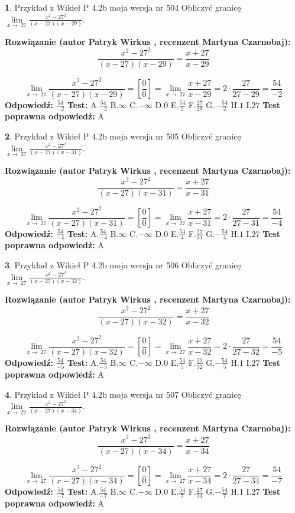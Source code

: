\documentclass[12pt, a4paper]{article}
\theoremstyle{definition} %
\newtheorem{zad}{}
\newcommand{\zadStart}[1]{\begin{zad}#1\newline}
\newcommand{\zadStop}{\end{zad}}
\newcommand{\rozwStart}[2]{\noindent \textbf{Rozwiązanie (autor #1 , recenzent #2): }\newline}
\newcommand{\rozwStop}{\newline}
\newcommand{\odpStart}{\noindent \textbf{Odpowiedź:}\newline}
\newcommand{\odpStop}{\newline}
\newcommand{\testStart}{\noindent \textbf{Test:}\newline}
\newcommand{\testStop}{\newline}
\newcommand{\kluczStart}{\noindent \textbf{Test poprawna odpowiedź:}\newline}
\newcommand{\kluczStop}{\newline}
\begin{document}
\zadStart{Przykład z Wikieł P 4.2b moja wersja nr 504}
Obliczyć granicę $\lim\limits_{x\to\ 27}\frac{x^{2}-27^{2}}{(x-27)(x-29)}$.
\zadStop
\rozwStart{Patryk Wirkus}{Martyna Czarnobaj}
$$\frac{x^{2}-27^{2}}{(x-27)(x-29)}=\frac{x+27}{x-29}$$

$$\lim\limits_{x\to\ 27}\frac{x^{2}-27^{2}}{(x-27)(x-29)}=[\frac{0}{0}]=\lim\limits_{x\to\ 27}\frac{x+27}{x-29}=2 \cdot \frac{27}{27-29} = \frac{54}{-2}$$
\rozwStop
\odpStart
$\frac{54}{-2}$
\odpStop
\testStart
A.$\frac{54}{-2}$
B.$\infty$
C.$-\infty$
D.$0$
E.$\frac{54}{2}$
F.$\frac{27}{29}$
G.$-\frac{54}{2}$
H.$1$
I.$27$
\testStop
\kluczStart
A
\kluczStop



\zadStart{Przykład z Wikieł P 4.2b moja wersja nr 505}
Obliczyć granicę $\lim\limits_{x\to\ 27}\frac{x^{2}-27^{2}}{(x-27)(x-31)}$.
\zadStop
\rozwStart{Patryk Wirkus}{Martyna Czarnobaj}
$$\frac{x^{2}-27^{2}}{(x-27)(x-31)}=\frac{x+27}{x-31}$$

$$\lim\limits_{x\to\ 27}\frac{x^{2}-27^{2}}{(x-27)(x-31)}=[\frac{0}{0}]=\lim\limits_{x\to\ 27}\frac{x+27}{x-31}=2 \cdot \frac{27}{27-31} = \frac{54}{-4}$$
\rozwStop
\odpStart
$\frac{54}{-4}$
\odpStop
\testStart
A.$\frac{54}{-4}$
B.$\infty$
C.$-\infty$
D.$0$
E.$\frac{54}{4}$
F.$\frac{27}{31}$
G.$-\frac{54}{4}$
H.$1$
I.$27$
\testStop
\kluczStart
A
\kluczStop



\zadStart{Przykład z Wikieł P 4.2b moja wersja nr 506}
Obliczyć granicę $\lim\limits_{x\to\ 27}\frac{x^{2}-27^{2}}{(x-27)(x-32)}$.
\zadStop
\rozwStart{Patryk Wirkus}{Martyna Czarnobaj}
$$\frac{x^{2}-27^{2}}{(x-27)(x-32)}=\frac{x+27}{x-32}$$

$$\lim\limits_{x\to\ 27}\frac{x^{2}-27^{2}}{(x-27)(x-32)}=[\frac{0}{0}]=\lim\limits_{x\to\ 27}\frac{x+27}{x-32}=2 \cdot \frac{27}{27-32} = \frac{54}{-5}$$
\rozwStop
\odpStart
$\frac{54}{-5}$
\odpStop
\testStart
A.$\frac{54}{-5}$
B.$\infty$
C.$-\infty$
D.$0$
E.$\frac{54}{5}$
F.$\frac{27}{32}$
G.$-\frac{54}{5}$
H.$1$
I.$27$
\testStop
\kluczStart
A
\kluczStop



\zadStart{Przykład z Wikieł P 4.2b moja wersja nr 507}
Obliczyć granicę $\lim\limits_{x\to\ 27}\frac{x^{2}-27^{2}}{(x-27)(x-34)}$.
\zadStop
\rozwStart{Patryk Wirkus}{Martyna Czarnobaj}
$$\frac{x^{2}-27^{2}}{(x-27)(x-34)}=\frac{x+27}{x-34}$$

$$\lim\limits_{x\to\ 27}\frac{x^{2}-27^{2}}{(x-27)(x-34)}=[\frac{0}{0}]=\lim\limits_{x\to\ 27}\frac{x+27}{x-34}=2 \cdot \frac{27}{27-34} = \frac{54}{-7}$$
\rozwStop
\odpStart
$\frac{54}{-7}$
\odpStop
\testStart
A.$\frac{54}{-7}$
B.$\infty$
C.$-\infty$
D.$0$
E.$\frac{54}{7}$
F.$\frac{27}{34}$
G.$-\frac{54}{7}$
H.$1$
I.$27$
\testStop
\kluczStart
A
\kluczStop
\end{document}
